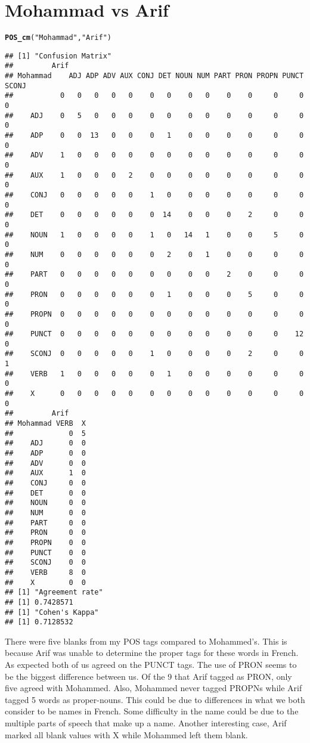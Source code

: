 \documentclass{article}\usepackage[]{graphicx}\usepackage[]{color}
\makeatletter
\newcommand{\hlstr}[1]{\textcolor[rgb]{0.192,0.494,0.8}{#1}}%
\newcommand{\hlstd}[1]{\textcolor[rgb]{0.345,0.345,0.345}{#1}}%
\newcommand{\hlkwd}[1]{\textcolor[rgb]{0.737,0.353,0.396}{\textbf{#1}}}%
\newenvironment{kframe}{%
 \def\at@end@of@kframe{}%
 \ifinner\ifhmode%
  \def\at@end@of@kframe{\end{minipage}}%
  \begin{minipage}{\columnwidth}%
 \fi\fi%
 \def\FrameCommand##1{\hskip\@totalleftmargin \hskip-\fboxsep
 \colorbox{shadecolor}{##1}\hskip-\fboxsep
     \hskip-\linewidth \hskip-\@totalleftmargin \hskip\columnwidth}%
 \MakeFramed {\advance\hsize-\width
   \@totalleftmargin\z@ \linewidth\hsize
   \@setminipage}}%
 {\par\unskip\endMakeFramed%
 \at@end@of@kframe}
\newenvironment{knitrout}{}{} %
\makeatother
\begin{document}
\section*{Mohammad vs Arif}
\begin{knitrout}
\color{fgcolor}\begin{kframe}
\begin{alltt}
\hlkwd{POS_cm}\hlstd{(}\hlstr{"Mohammad"}\hlstd{,}\hlstr{"Arif"}\hlstd{)}
\end{alltt}
\begin{verbatim}
## [1] "Confusion Matrix"
##         Arif
## Mohammad    ADJ ADP ADV AUX CONJ DET NOUN NUM PART PRON PROPN PUNCT SCONJ
##           0   0   0   0   0    0   0    0   0    0    0     0     0     0
##    ADJ    0   5   0   0   0    0   0    0   0    0    0     0     0     0
##    ADP    0   0  13   0   0    0   1    0   0    0    0     0     0     0
##    ADV    1   0   0   0   0    0   0    0   0    0    0     0     0     0
##    AUX    1   0   0   0   2    0   0    0   0    0    0     0     0     0
##    CONJ   0   0   0   0   0    1   0    0   0    0    0     0     0     0
##    DET    0   0   0   0   0    0  14    0   0    0    2     0     0     0
##    NOUN   1   0   0   0   0    1   0   14   1    0    0     5     0     0
##    NUM    0   0   0   0   0    0   2    0   1    0    0     0     0     0
##    PART   0   0   0   0   0    0   0    0   0    2    0     0     0     0
##    PRON   0   0   0   0   0    0   1    0   0    0    5     0     0     0
##    PROPN  0   0   0   0   0    0   0    0   0    0    0     0     0     0
##    PUNCT  0   0   0   0   0    0   0    0   0    0    0     0    12     0
##    SCONJ  0   0   0   0   0    1   0    0   0    0    2     0     0     1
##    VERB   1   0   0   0   0    0   1    0   0    0    0     0     0     0
##    X      0   0   0   0   0    0   0    0   0    0    0     0     0     0
##         Arif
## Mohammad VERB  X
##             0  5
##    ADJ      0  0
##    ADP      0  0
##    ADV      0  0
##    AUX      1  0
##    CONJ     0  0
##    DET      0  0
##    NOUN     0  0
##    NUM      0  0
##    PART     0  0
##    PRON     0  0
##    PROPN    0  0
##    PUNCT    0  0
##    SCONJ    0  0
##    VERB     8  0
##    X        0  0
## [1] "Agreement rate"
## [1] 0.7428571
## [1] "Cohen's Kappa"
## [1] 0.7128532
\end{verbatim}
\end{kframe}
\end{knitrout}
There were five blanks from my POS tags compared to Mohammed's. This is because Arif was unable to determine the proper tags for these words in French. As expected both of us agreed on the PUNCT tags. The use of PRON seems to be the biggest difference between us. Of the 9 that Arif tagged as PRON, only five agreed with Mohammed. Also, Mohammed never tagged PROPNs while Arif tagged 5 words as proper-nouns. This could be due to differences in what we both consider to be names in French. Some difficulty in the name could be due to the multiple parts of speech that make up a name. Another interesting case, Arif marked all blank values with X while Mohammed left them blank.
\end{document}
